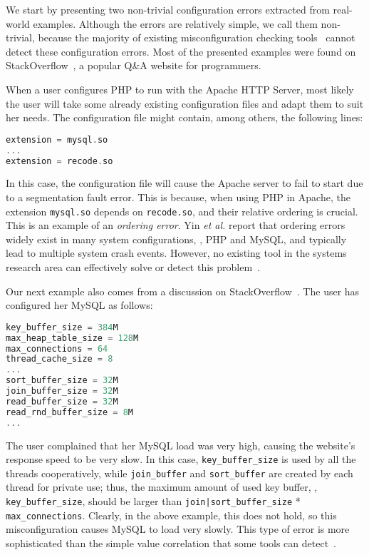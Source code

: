 We start by presenting two non-trivial configuration errors
extracted from real-world examples. 
Although the errors are relatively simple, we call them 
non-trivial, because the majority of existing misconfiguration
checking tools~\cite{zhang14encore, wang04automatic} cannot detect
these configuration errors. 
Most of the presented examples were found on
StackOverflow~\cite{stackoverflow},
a popular Q\&A website for programmers.

When a user configures PHP  to run with the Apache HTTP Server, most 
likely the user will take some already existing configuration files and 
adapt them to suit her needs. The configuration file might contain, among 
others,  the following lines:
\begin{lstlisting}[language=C, xleftmargin=.01\textwidth]
extension = mysql.so
...
extension = recode.so
\end{lstlisting} 
In this case, the configuration file will cause the Apache server to 
fail to start due to a segmentation fault error. 
This is because, when using PHP in Apache, the extension {\tt mysql.so} 
depends on {\tt recode.so}, and their relative ordering
is crucial. This is an example of an {\em ordering error}.
Yin {\em et al.} report that ordering errors widely exist in
many system configurations, \eg, PHP and MySQL,
and typically lead to multiple system crash events.
However, no existing tool in the systems research area can effectively solve 
or detect this problem~\cite{zhang14encore, xu15systems, xu13do}.


Our next example also comes from a discussion on 
StackOverflow~\cite{correlation}.
The user has configured her MySQL as follows:
\begin{lstlisting}[language=C, xleftmargin=.01\textwidth]
key_buffer_size = 384M
max_heap_table_size = 128M
max_connections = 64
thread_cache_size = 8
...
sort_buffer_size = 32M
join_buffer_size = 32M
read_buffer_size = 32M
read_rnd_buffer_size = 8M
...
\end{lstlisting} 
The user complained that her MySQL load was very high, causing the website's
response speed to be very slow.
In this case, {\tt key\_buffer\_size} is used by all the threads
cooperatively, while {\tt join\_buffer} and {\tt sort\_buffer} are 
created by each thread for private use; thus, the maximum amount
of used key buffer, \ie, {\tt key\_buffer\_size}, should be larger than 
{\tt join|sort\_buffer\_size} * {\tt max\_connections}. 
Clearly, in the above example, this does not hold, 
so this misconfiguration causes MySQL to load very slowly.
This type of error is more sophisticated than the simple value correlation that some tools can detect~\cite{yin11anempirical, zhang14encore}.


